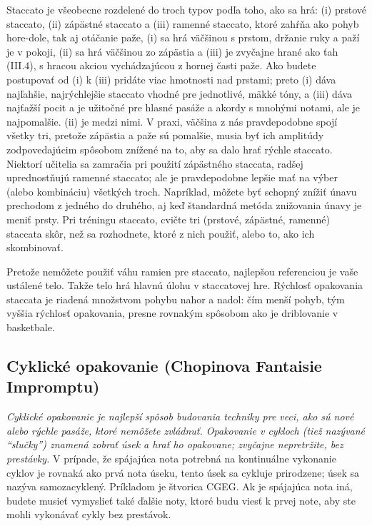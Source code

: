 Staccato je všeobecne rozdelené do troch typov podľa toho, ako sa hrá: (i) prstové staccato, (ii) zápästné staccato a (iii) ramenné staccato, ktoré zahŕňa ako pohyb hore-dole, tak aj otáčanie paže, (i) sa hrá väčšinou s prstom, držanie ruky a paží je v pokoji, (ii) sa hrá väčšinou zo zápästia a (iii) je zvyčajne hrané ako ťah (III.4), s hracou akciou vychádzajúcou z hornej časti paže. Ako budete postupovať od (i) k (iii) pridáte viac hmotnosti nad prstami; preto (i) dáva najľahšie, najrýchlejšie staccato vhodné pre jednotlivé, mäkké tóny, a (iii) dáva najťažší pocit a je užitočné pre hlasné pasáže a akordy s mnohými notami, ale je najpomalšie. (ii) je medzi nimi. V praxi, väčšina z nás pravdepodobne spojí všetky tri, pretože zápästia a paže sú pomalšie, musia byť ich amplitúdy zodpovedajúcim spôsobom znížené na to, aby sa dalo hrať rýchle staccato. Niektorí učitelia sa zamračia pri použití zápästného staccata, radšej uprednostňujú ramenné staccato; ale je pravdepodobne lepšie mať na výber (alebo kombináciu) všetkých troch. Napríklad, môžete byť schopný znížiť únavu prechodom z jedného do druhého, aj keď štandardná metóda znižovania únavy je meniť prsty. Pri tréningu staccato, cvičte tri (prstové, zápästné, ramenné) staccata skôr, než sa rozhodnete, ktoré z nich použiť, alebo to, ako ich skombinovať.

Pretože nemôžete použiť váhu ramien pre staccato, najlepšou referenciou je vaše ustálené telo. Takže telo hrá hlavnú úlohu v staccatovej hre. Rýchlosť opakovania staccata je riadená množstvom pohybu nahor a nadol: čím menší pohyb, tým vyššia rýchlosť opakovania, presne rovnakým spôsobom ako je driblovanie v basketbale.

\subsection{Cyklické opakovanie (Chopinova Fantaisie Impromptu)}
\emph{Cyklické opakovanie je najlepší spôsob budovania techniky pre veci, ako sú nové alebo rýchle pasáže, ktoré nemôžete zvládnuť. Opakovanie v cykloch (tiež nazývané “slučky”) znamená zobrať úsek a hrať ho opakovane; zvyčajne nepretržite, bez prestávky.} V prípade, že spájajúca nota potrebná na kontinuálne vykonanie cyklov je rovnaká ako prvá nota úseku, tento úsek sa cykluje prirodzene; úsek sa nazýva samozacyklený. Príkladom je štvorica CGEG. Ak je spájajúca nota iná, budete musieť vymyslieť také ďalšie noty, ktoré budu viesť k prvej note, aby ste mohli vykonávať cykly bez prestávok. 

